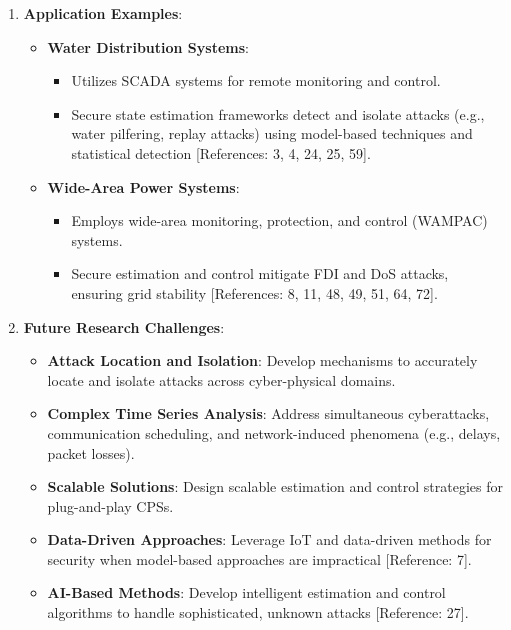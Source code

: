 \documentclass{article}
\begin{document}
\begin{enumerate}[leftmargin=*]
    \item \textbf{Application Examples}:
    \begin{itemize}
        \item \textbf{Water Distribution Systems}:
        \begin{itemize}
            \item Utilizes SCADA systems for remote monitoring and control.
            \item Secure state estimation frameworks detect and isolate attacks (e.g., water pilfering, replay attacks) using model-based techniques and statistical detection [References: 3, 4, 24, 25, 59].
        \end{itemize}
        \item \textbf{Wide-Area Power Systems}:
        \begin{itemize}
            \item Employs wide-area monitoring, protection, and control (WAMPAC) systems.
            \item Secure estimation and control mitigate FDI and DoS attacks, ensuring grid stability [References: 8, 11, 48, 49, 51, 64, 72].
        \end{itemize}
    \end{itemize}
    
    \item \textbf{Future Research Challenges}:
    \begin{itemize}
        \item \textbf{Attack Location and Isolation}: Develop mechanisms to accurately locate and isolate attacks across cyber-physical domains.
        \item \textbf{Complex Time Series Analysis}: Address simultaneous cyberattacks, communication scheduling, and network-induced phenomena (e.g., delays, packet losses).
        \item \textbf{Scalable Solutions}: Design scalable estimation and control strategies for plug-and-play CPSs.
        \item \textbf{Data-Driven Approaches}: Leverage IoT and data-driven methods for security when model-based approaches are impractical [Reference: 7].
        \item \textbf{AI-Based Methods}: Develop intelligent estimation and control algorithms to handle sophisticated, unknown attacks [Reference: 27].
    \end{itemize}
\end{enumerate}
\end{document}

